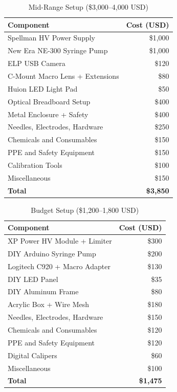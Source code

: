 \documentclass[11pt]{article}
\begin{document}
\begin{table}[H]
\centering
\caption{Mid-Range Setup (\$3,000--4,000 USD)}
\small
\begin{tabular}{lr}
\toprule
Component & Cost (USD) \\
\midrule
Spellman HV Power Supply & \$1,000 \\
New Era NE-300 Syringe Pump & \$1,000 \\
ELP USB Camera & \$120 \\
C-Mount Macro Lens + Extensions & \$80 \\
Huion LED Light Pad & \$50 \\
Optical Breadboard Setup & \$400 \\
Metal Enclosure + Safety & \$400 \\
Needles, Electrodes, Hardware & \$250 \\
Chemicals and Consumables & \$150 \\
PPE and Safety Equipment & \$150 \\
Calibration Tools & \$100 \\
Miscellaneous & \$150 \\
\midrule
\textbf{Total} & \textbf{\$3,850} \\
\bottomrule
\end{tabular}
\end{table}

\begin{table}[H]
\centering
\caption{Budget Setup (\$1,200--1,800 USD)}
\small
\begin{tabular}{lr}
\toprule
Component & Cost (USD) \\
\midrule
XP Power HV Module + Limiter & \$300 \\
DIY Arduino Syringe Pump & \$200 \\
Logitech C920 + Macro Adapter & \$130 \\
DIY LED Panel & \$35 \\
DIY Aluminum Frame & \$80 \\
Acrylic Box + Wire Mesh & \$180 \\
Needles, Electrodes, Hardware & \$150 \\
Chemicals and Consumables & \$120 \\
PPE and Safety Equipment & \$120 \\
Digital Calipers & \$60 \\
Miscellaneous & \$100 \\
\midrule
\textbf{Total} & \textbf{\$1,475} \\
\bottomrule
\end{tabular}
\end{table}
\end{document}
